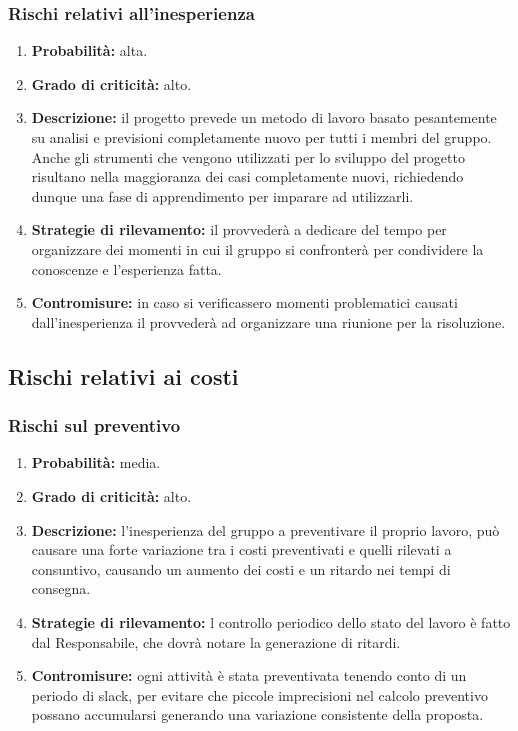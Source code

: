 \subsubsection{Rischi relativi all'inesperienza}
\begin{enumerate}
	\item \textbf{Probabilità:} alta.
	\item \textbf{Grado di criticità:} alto.
	\item \textbf{Descrizione:} il progetto prevede un metodo di lavoro basato pesantemente su analisi e previsioni completamente nuovo per tutti i membri del gruppo. Anche gli strumenti che vengono utilizzati per lo sviluppo del progetto risultano nella maggioranza dei casi completamente nuovi, richiedendo dunque una fase di apprendimento per imparare ad utilizzarli.
	\item \textbf{Strategie di rilevamento:} il \Responsabile{} provvederà a dedicare del tempo per organizzare dei momenti in cui il gruppo si confronterà per condividere la conoscenze e l'esperienza fatta.
	\item \textbf{Contromisure:} in caso si verificassero momenti problematici causati dall'inesperienza il \Responsabile{} provvederà ad organizzare una riunione per la risoluzione.
\end{enumerate}

\subsection{Rischi relativi ai costi}
\subsubsection{Rischi sul preventivo}
\begin{enumerate}
	\item \textbf{Probabilità:} media.
	\item \textbf{Grado di criticità:} alto.
	\item \textbf{Descrizione:} l’inesperienza del gruppo a preventivare il proprio lavoro, può causare una forte variazione tra i costi preventivati e quelli rilevati a consuntivo, causando un aumento dei costi e un ritardo nei tempi di consegna.
	\item \textbf{Strategie di rilevamento:} l controllo periodico dello stato del lavoro è fatto dal Responsabile, che dovrà notare la generazione di ritardi.
	\item \textbf{Contromisure:} ogni attività è stata preventivata tenendo conto di un periodo di slack, per evitare che piccole imprecisioni nel calcolo preventivo possano accumularsi generando una variazione consistente della proposta.
\end{enumerate}





